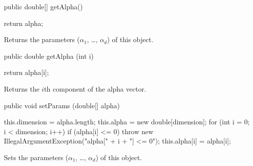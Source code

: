\begin{code}

   public double[] getAlpha()\begin{hide} {
      return alpha;
   }\end{hide}
\end{code}
\begin{tabb}
   Returns the parameters ($\alpha_1$, \ldots, $\alpha_d$) of this object.
\end{tabb}
\begin{code}

   public double getAlpha (int i)\begin{hide} {
      return alpha[i];
   }\end{hide}
\end{code}
\begin{tabb}
   Returns the $i$th component of the alpha vector.
\end{tabb}
\begin{code}

   public void setParams (double[] alpha)\begin{hide} {
      this.dimension = alpha.length;
      this.alpha = new double[dimension];
      for (int i = 0; i < dimension; i++) {
         if (alpha[i] <= 0)
            throw new IllegalArgumentException("alpha[" + i + "] <= 0");
         this.alpha[i] = alpha[i];
      }
   }\end{hide}
\end{code}
\begin{tabb}
   Sets the parameters ($\alpha_1$, \ldots, $\alpha_d$) of this object.
\end{tabb}
\begin{code}\begin{hide}
}\end{hide}
\end{code}
